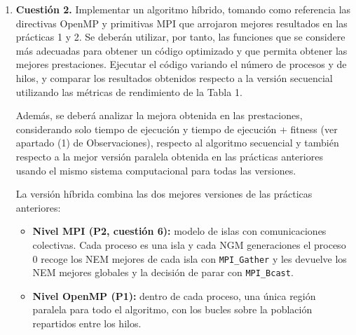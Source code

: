\documentclass[12pt]{article}
\begin{document}
\begin{enumerate}
\vspace{0.5cm}

\medskip
\noindent\textbf{Inicialización de la semilla (\texttt{aplicar\_mh} en \texttt{mh.c})}\par
\smallskip

\begin{lstlisting}[style=EstiloC]
// P3 CUESTIÓN 1: en lugar de srand se inicializa la semilla de rand_r
semilla = (unsigned int) (time(NULL) + getpid() + rank * 1000);
\end{lstlisting}

\textbf{Justificación:} Sustituye al \texttt{srand} de la P2. Se mantiene el \texttt{rank} para que cada isla tenga una semilla distinta y evolucione de forma diferente. En esta cuestión todavía no hay hilos, así que hay una semilla por proceso; en la cuestión 2 se añade el número de hilo para que cada hilo de cada proceso tenga la suya. En el \texttt{Makefile} se ha añadido \texttt{-fopenmp} para que se reconozca la directiva \texttt{threadprivate}. Se ha comprobado que el programa da el mismo fitness que la P2.


\newpage
\item \textbf{Cuestión 2.} Implementar un algoritmo híbrido, tomando como referencia las directivas OpenMP y primitivas MPI que arrojaron mejores resultados en las prácticas 1 y 2. Se deberán utilizar, por tanto, las funciones que se considere más adecuadas para obtener un código optimizado y que permita obtener las mejores prestaciones. Ejecutar el código variando el número de procesos y de hilos, y comparar los resultados obtenidos respecto a la versión secuencial utilizando las métricas de rendimiento de la Tabla 1.

Además, se deberá analizar la mejora obtenida en las prestaciones, considerando solo tiempo de ejecución y tiempo de ejecución + fitness (ver apartado (1) de Observaciones), respecto al algoritmo secuencial y también respecto a la mejor versión paralela obtenida en las prácticas anteriores usando el mismo sistema computacional para todas las versiones.


La versión híbrida combina las dos mejores versiones de las prácticas anteriores:

\begin{itemize}
    \item \textbf{Nivel MPI (P2, cuestión 6):} modelo de islas con comunicaciones colectivas. Cada proceso es una isla y cada NGM generaciones el proceso 0 recoge los NEM mejores de cada isla con \texttt{MPI\_Gather} y les devuelve los NEM mejores globales y la decisión de parar con \texttt{MPI\_Bcast}.
    \item \textbf{Nivel OpenMP (P1):} dentro de cada proceso, una única región paralela para todo el algoritmo, con los bucles sobre la población repartidos entre los hilos.
\end{itemize}


\end{enumerate}
\end{document}
